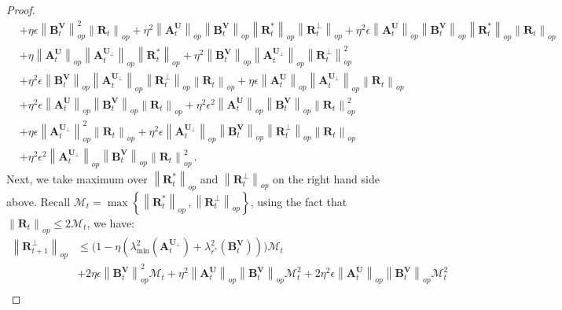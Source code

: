 \begin{proof}
\begin{align*}
        & + \eta \epsilon \left\|\bm B^{\bm V}_{t}\right\|_{op}^2 \left\|\bm R_{t}\right\|_{op} + \eta^2 \left\|\bm A^{\bm U}_{t}\right\|_{op}\left\|\bm B^{\bm V}_{t}\right\|_{op}\left\|\bm R^*_{t}\right\|_{op}\left\|\bm R^\perp_{t}\right\|_{op} + \eta^2 \epsilon \left\|\bm A^{\bm U}_{t}\right\|_{op}\left\|\bm B^{\bm V}_{t}\right\|_{op}\left\|\bm R^*_{t}\right\|_{op}\left\|\bm R_{t}\right\|_{op}\\
        & + \eta \left\|\bm A^{\bm U}_{t}\right\|_{op}\left\|\bm A^{\bm U_\perp}_{t}\right\|_{op}\left\|\bm R^*_{t}\right\|_{op}+\eta^2 \left\|\bm B^{\bm V}_{t}\right\|_{op}\left\|\bm A^{\bm U_\perp}_{t}\right\|_{op}\left\|\bm R^\perp_{t}\right\|_{op}^2\\
        & +\eta^2 \epsilon \left\|\bm B^{\bm V}_{t}\right\|_{op}\left\|\bm A^{\bm U_\perp}_{t}\right\|_{op}\left\|\bm R^\perp_{t}\right\|_{op}\left\|\bm R_{t}\right\|_{op}+\eta \epsilon \left\|\bm A^{\bm U}_{t}\right\|_{op}\left\|\bm A^{\bm U_\perp}_{t}\right\|_{op} \left\|\bm R_{t}\right\|_{op}\\
        & + \eta^2 \epsilon \left\|\bm A^{\bm U}_{t}\right\|_{op}\left\|\bm B^{\bm V}_{t}\right\|_{op} \left\|\bm R_{t}\right\|_{op} + \eta^2 \epsilon^2 \left\|\bm A^{\bm U}_{t}\right\|_{op}\left\|\bm B^{\bm V}_{t}\right\|_{op} \left\|\bm R_{t}\right\|_{op}^2\\
        & + \eta \epsilon \left\|\bm A^{\bm U_\perp}_{t}\right\|_{op}^2\left\|\bm R_{t}\right\|_{op}+\eta^2 \epsilon \left\|\bm A^{\bm U_\perp}_{t}\right\|_{op}\left\|\bm B^{\bm V}_{t}\right\|_{op}\left\|\bm R^\perp_{t}\right\|_{op}\left\|\bm R_{t}\right\|_{op}\\
        & + \eta^2 \epsilon^2 \left\|\bm A^{\bm U_\perp}_{t}\right\|_{op}\left\|\bm B^{\bm V}_{t}\right\|_{op} \left\|\bm R_{t}\right\|_{op}^2\,.
    \end{align*}
    Next, we take maximum over $\left\|\bm R^*_{t}\right\|_{op}$  and $\left\|\bm R^\perp_{t}\right\|_{op}$ on the right hand side above. Recall $\mathcal{M}_t=\max \left\{\left\|\bm R^*_{t}\right\|_{op}\,,\left\|\bm R^\perp_{t}\right\|_{op}\right\}$, using the fact that $\left\|\bm R_{t}\right\|_{op}\leq 2 \mathcal{M}_t$, we have:
    \begin{align*}
        \left\|\bm R^\perp_{t+1}\right\|_{op} & \leq \bigg(1-\eta\left(\lambda_{\min}^2\left(\bm A_t^{\bm U_\perp}\right)+\lambda_{r^*}^2\left(\bm B_t^{\bm V}\right)\right)\bigg)\mathcal{M}_t\\
        & + 2 \eta \epsilon \left\|\bm B^{\bm V}_{t}\right\|_{op}^2 \mathcal{M}_t + \eta^2 \left\|\bm A^{\bm U}_{t}\right\|_{op}\left\|\bm B^{\bm V}_{t}\right\|_{op}\mathcal{M}_t^2 + 2\eta^2 \epsilon \left\|\bm A^{\bm U}_{t}\right\|_{op}\left\|\bm B^{\bm V}_{t}\right\|_{op}\mathcal{M}_t^2\\

\end{align*}
\end{proof}
